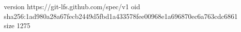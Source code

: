 version https://git-lfs.github.com/spec/v1
oid sha256:1ad980a28a67fecb2449d5fbd1a433578fee00968e1a696870ec6a763cdc6861
size 1275
